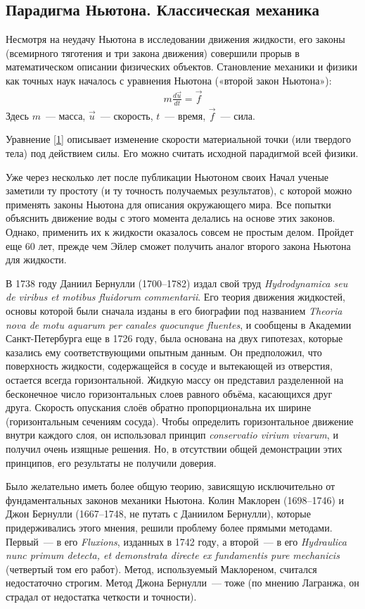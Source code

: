 \subsection*{Парадигма Ньютона. Классическая механика}

Несмотря на неудачу Ньютона в исследовании движения жидкости, его законы (всемирного тяготения и три закона движения) 
совершили прорыв в математическом описании физических объектов. Становление механики и физики как точных наук началось с 
уравнения Ньютона («второй закон Ньютона»):
\begin{gather}
	m \frac{d \vec u}{d t} = \vec f
	\label{1}
\end{gather}
Здесь $m$~--- масса, $\vec u$~--- скорость, $t$~--- время, $\vec f$~--- сила.

Уравнение \ref{1} описывает изменение скорости материальной точки (или твердого тела) под действием силы.
 Его можно считать исходной парадигмой всей физики.

Уже через несколько лет после публикации Ньютоном своих Начал ученые заметили ту простоту (и ту точность получаемых 
результатов), с которой можно применять законы Ньютона для описания окружающего мира. Все попытки объяснить движение 
воды с этого момента делались на основе этих законов. Однако, применить их к жидкости оказалось совсем не простым делом.
 Пройдет еще 60 лет, прежде чем Эйлер сможет получить аналог второго закона Ньютона для жидкости.

В 1738 году Даниил Бернулли (1700--1782) издал свой труд \textit{Hydrodynamica seu de viribus et motibus fluidorum
commentarii}. Его теория движения жидкостей, основы которой были сначала изданы в его биографии под названием 
\textit{Theoria nova de motu aquarum per canales quocunque fluentes}, и сообщены в Академии Санкт-Петербурга 
еще в 1726 году, была основана на двух гипотезах, которые казались ему соответствующими опытным данным. 
Он предположил, что поверхность жидкости, содержащейся в сосуде и вытекающей из отверстия, остается всегда
горизонтальной. Жидкую массу он представил разделенной на бесконечное число горизонтальных слоев равного объёма,
касающихся друг друга. Скорость опускания слоёв обратно пропорциональна их ширине (горизонтальным сечениям сосуда).
Чтобы определить горизонтальное движение внутри каждого слоя, он использовал принцип \textit{ conservatio virium
vivarum}, и получил очень изящные решения. Но, в отсутствии общей демонстрации этих принципов, его результаты не
получили доверия.

Было желательно иметь более общую теорию, зависящую исключительно от фундаментальных законов механики Ньютона. 
Колин Маклорен (1698--1746) и Джон Бернулли (1667--1748, не путать с Даниилом Бернулли), которые придерживались 
этого мнения, решили проблему более прямыми методами. Первый~--- в его \textit{Fluxions}, изданных в 1742 году, 
а второй~--- в его \textit{Hydraulica nunc primum detecta, et demonstrata directe ex fundamentis pure mechanicis} 
(четвертый том его работ). Метод, используемый Маклореном, считался недостаточно строгим. Метод Джона Бернулли~--- 
тоже (по мнению Лагранжа, он страдал от недостатка четкости и точности).


